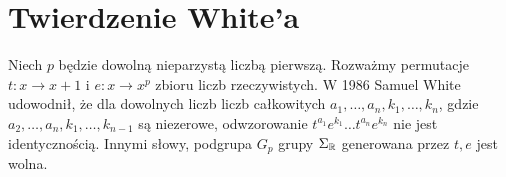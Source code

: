 \chapter{Twierdzenie White'a}

Niech $p$ będzie dowolną nieparzystą liczbą pierwszą. Rozważmy permutacje $t :
x \rightarrow  x+1$ i $e: x \rightarrow x^p$ zbioru liczb rzeczywistych. W 1986
Samuel White \cite{whi88} udowodnił, że dla dowolnych liczb liczb całkowitych
$a_1, \ldots, a_n, k_1, \ldots, k_n$, gdzie $a_2, \ldots, a_n, k_1, \ldots,
k_{n-1}$ są niezerowe, odwzorowanie $t^{a_1}e^{k_1}\ldots t^{a_n}e^{k_n}$ nie
jest identycznością. Innymi słowy, podgrupa $G_p$ grupy $\Sigma_{\mathbb{R}}$ generowana
przez $t, e$ jest wolna.
